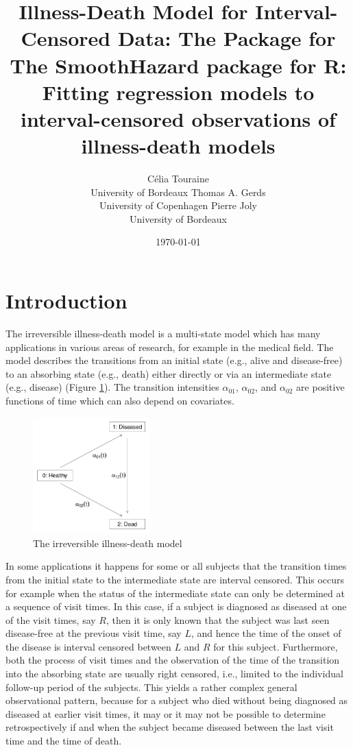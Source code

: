 \documentclass[article]{jss}
\author{C\'elia Touraine\\University of Bordeaux \And Thomas A. Gerds\\University of Copenhagen \And Pierre Joly\\University of Bordeaux}
\title{Illness-Death Model for Interval-Censored Data: The \pkg{SmoothHazard} Package for \proglang{R}}
\date{\today}
\title{The SmoothHazard package for R: Fitting regression models to interval-censored observations of illness-death models}
\begin{document}
\maketitle
\section{Introduction}
\label{sec-1}

The irreversible illness-death model is a multi-state model which has
many applications in various areas of research, for example in the
medical field. The model describes the transitions from an initial
state (e.g., alive and disease-free) to an absorbing state (e.g.,
death) either directly or via an intermediate state (e.g., disease)
(Figure \ref{fig:1}). The transition intensities \(\alpha_{01}\),
\(\alpha_{02}\), and \(\alpha_{02}\) are positive functions of time which
can also depend on covariates.

\begin{figure}[htb]
\centering
\includegraphics[width=0.4\textwidth]{fig1.pdf}
\caption{\label{fig:1}The irreversible illness-death model}
\end{figure}

In some applications it happens for some or all subjects that the
transition times from the initial state to the intermediate state are
interval censored. This occurs for example when the status of the
intermediate state can only be determined at a sequence of visit
times. In this case, if a subject is diagnosed as diseased at one of
the visit times, say \(R\), then it is only known that the subject was
last seen disease-free at the previous visit time, say \(L\), and hence
the time of the onset of the disease is interval censored between \(L\)
and \(R\) for this subject. Furthermore, both the process of visit times
and the observation of the time of the transition into the absorbing
state are usually right censored, i.e., limited to the individual
follow-up period of the subjects. This yields a rather complex general
observational pattern, because for a subject who died without being
diagnosed as diseased at earlier visit times, it may or it may not be
possible to determine retrospectively if and when the subject became
diseased between the last visit time and the time of death.
\end{document}
